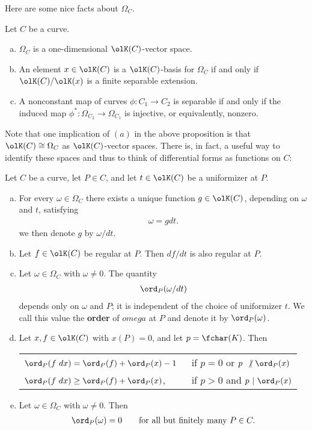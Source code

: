 Here are some nice facts about $\Omega_C$.
\begin{prop}\label{prop:separable-map-and-diff-forms}
	Let $C$ be a curve.
	\begin{enumerate}[(a)]
		\item $\Omega_C$ is a one-dimensional $\olK(C)$-vector space.
		\item An element $x \in \olK(C)$ is a $\olK(C)$-basis for $\Omega_C$ if and only if $\olK(C)/\olK(x)$ is a finite separable extension.
		\item A nonconstant map of curves $\phi:C_1\to C_2$ is separable if and only if the induced map $\phi^*:\Omega_{C_2}\to \Omega_{C_1}$ is injective, or equivalently, nonzero.
	\end{enumerate}
\end{prop}
Note that one implication of $(a)$ in the above proposition is that $\olK(C) \cong \Omega_C$ as $\olK(C)$-vector spaces. There is, in fact, a useful way to identify these spaces and thus to think of differential forms as functions on $C$:
\begin{prop}\label{prop:diff-forms-as-K(C)}
	Let $C$ be a curve, let $P \in C$, and let $t \in \olK(C)$ be a uniformizer at $P$.
	\begin{enumerate}[(a)]
		\item For every $\omega \in \Omega_C$ there exists a unique function $g \in \olK(C)$, depending on $\omega$ and $t$, satisfying
			\begin{align*}
				\omega = g dt.
			\end{align*}
			we then denote $g$ by $\omega/dt$.
		\item Let $f \in \olK(C)$ be regular at $P$. Then $df/dt$ is also regular at $P$.
		\item Let $\omega \in \Omega_C$ with $\omega \neq 0$. The quantity
			\begin{align*}
				\ord_P(\omega/dt)
			\end{align*}
			depends only on $\omega$ and $P$; it is independent of the choice of uniformizer $t$. We call this value the \textbf{order} of $omega$ at $P$ and denote it by $\ord_P(\omega)$.
		\item Let $x, f\in \olK(C)$ with $x(P) = 0$, and let $p = \fchar(K)$. Then
			\begin{center}
			\begin{tabular}{ll}
				$\ord_P(f~dx) = \ord_P(f) + \ord_P(x) - 1$~ & if $p = 0$ or $p ~\not|~ \ord_P(x)$ \\
				$\ord_P(f~dx) \geq \ord_P(f) + \ord_P(x)$, & if $p > 0$ and $p ~ | ~ \ord_P(x)$
			\end{tabular}
			\end{center}
		\item Let $\omega \in \Omega_C$ with $\omega \neq 0$. Then 
			\begin{align*}
				\ord_P(\omega) = 0 \hspace{2em} \text{for all but finitely many~} P \in C.
			\end{align*}
	\end{enumerate}
\end{prop}
